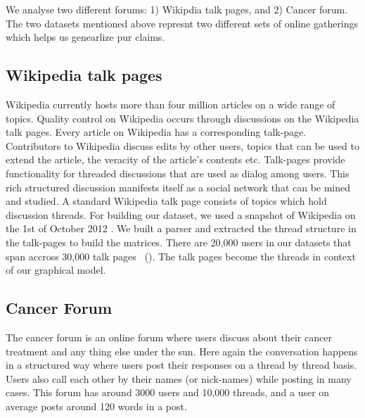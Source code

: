 We analyse two different forums: 1) Wikipdia talk pages, and 2) Cancer forum.
The two datasets mentioned above represnt two different sets of
online gatherings which helps us genearlize pur claims. 
\subsection{Wikipedia talk pages}
Wikipedia currently hosts more than four million articles on a wide range of topics.
Quality control on Wikipedia occurs through discussions on the Wikipedia talk pages. 
Every article on Wikipedia has a corresponding talk-page. Contributors to Wikipedia 
discuss edits by other users, topics that can be used to extend the article, 
the veracity of the article's contents etc. Talk-pages provide functionality
for threaded discussions that are used as dialog among users. This rich
structured discussion manifests itself as a social network that can be mined and
studied.  A standard Wikipedia talk page consists of topics which hold
discussion threads. For building our dataset, we used a snapshot of Wikipedia on
the 1st of October 2012 \cite{wikipedia}. We built a parser and extracted the
thread structure in the talk-pages to build the matrices. There are 20,000 users
in our datasets that span accross 30,000 talk pages ~().
The talk pages become the threads in context of our graphical model.

\subsection{Cancer Forum}
The cancer forum is an online forum where users discuss about their cancer
treatment and any thing else under the sun. Here again the conversation happens
in a structured way where users post their responses on a thread by thread
basis. Users also call each other by their names (or nick-names) while posting
in many cases. This forum has around 3000 users and 10,000 threads, and a user
on average posts around 120 words in a post.

